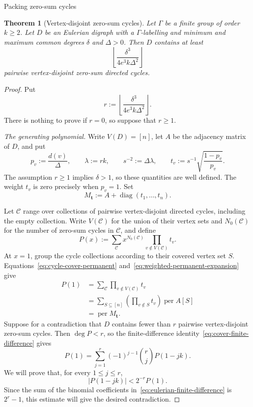 \documentclass[11pt]{amsart}
\makeatletter
\def\subsection{\@startsection{subsection}{2}%
  \z@{1.05\linespacing\@plus.5\linespacing}{.4\linespacing}%
  {\normalfont\large\bfseries\raggedright}}
\newtheorem{theorem}{Theorem}[section]
\theoremstyle{remark}
\newcommand{\per}{\operatorname{per}}
\newcommand{\diag}{\operatorname{diag}}
\makeatother
\begin{document}
\subsection{Packing zero-sum cycles}

\begin{theorem}[Vertex-disjoint zero-sum cycles]
\label{thm:eulerian-vertex-packing}
Let $\Gamma$ be a finite group of order $k\ge2$.  Let $D$ be an
Eulerian digraph with a $\Gamma$-labelling and minimum and maximum
common degrees $\delta$ and $\Delta>0$.  Then $D$ contains at least
\[
  \left\lfloor\frac{\delta^3}{4e^3k\Delta^2}\right\rfloor
\]
pairwise vertex-disjoint zero-sum directed cycles.
\end{theorem}

\begin{proof}
Put
\[
  r:=\left\lfloor\frac{\delta^3}{4e^3k\Delta^2}\right\rfloor.
\]
There is nothing to prove if $r=0$, so suppose that $r\ge1$.

\medskip\noindent
\emph{The generating polynomial.}
Write $V(D)=[n]$, let $A$ be the adjacency matrix of $D$, and put
\[
  p_v:=\frac{d(v)}\Delta,
  \qquad \lambda:=rk,
  \qquad s^{-2}:=\Delta\lambda,
  \qquad
  t_v:=s^{-1}\sqrt{\frac{1-p_v}{p_v}}.
\]
The assumption $r\ge1$ implies $\delta>1$, so these quantities are
well defined.  The weight $t_v$ is zero precisely when $p_v=1$.
Set
\[
  M_{\mathbf t}:=A+\diag(t_1,\ldots,t_n).
\]

Let $\mathcal C$ range over collections of pairwise vertex-disjoint
directed cycles, including the empty collection.  Write $V(\mathcal C)$
for the union of their vertex sets and $N_0(\mathcal C)$ for the number
of zero-sum cycles in $\mathcal C$, and define
\[
  P(x):=
  \sum_{\mathcal C}x^{N_0(\mathcal C)}
  \prod_{v\notin V(\mathcal C)}t_v.
\]
At $x=1$, group the cycle collections according to their covered
vertex set $S$.  Equations~\eqref{eq:cycle-cover-permanent}
and~\eqref{eq:weighted-permanent-expansion} give
\begin{align*}
  P(1)
  &=\sum_{\mathcal C}\prod_{v\notin V(\mathcal C)}t_v\\
  &=\sum_{S\subseteq[n]}
    \left(\prod_{v\notin S}t_v\right)\per A[S]\\
  &=\per M_{\mathbf t}.
\end{align*}
Suppose for a contradiction that $D$ contains fewer than $r$
pairwise vertex-disjoint zero-sum cycles.  Then $\deg P<r$, so the
finite-difference identity~\eqref{eq:cover-finite-difference} gives
\begin{equation}\label{eq:eulerian-finite-difference}
  P(1)=\sum_{j=1}^r(-1)^{j-1}\binom rj P(1-jk).
\end{equation}
We will prove that, for every $1\le j\le r$,
\begin{equation}\label{eq:eulerian-shifted-target}
  |P(1-jk)|<2^{-r}P(1).
\end{equation}
Since the sum of the binomial coefficients
in~\eqref{eq:eulerian-finite-difference} is $2^r-1$, this estimate will
give the desired contradiction.


\end{proof}
\end{document}
